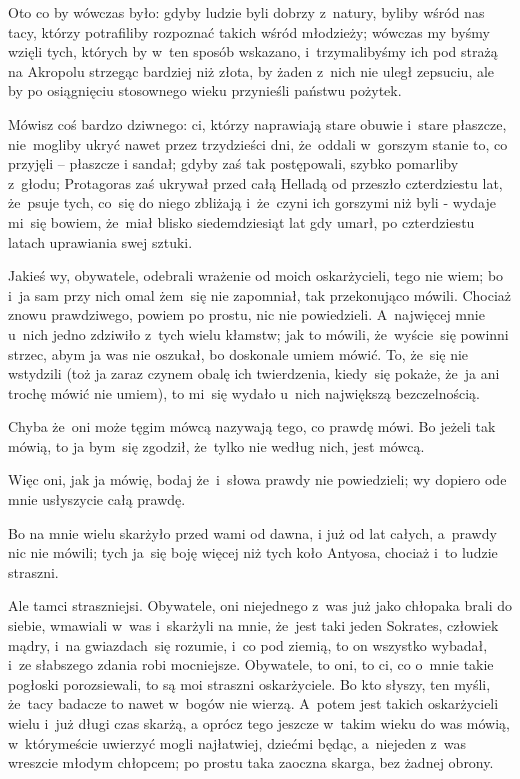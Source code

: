 
\noi Oto co by wówczas było: gdyby ludzie byli dobrzy z~natury, byliby
wśród nas tacy, którzy potrafiliby rozpoznać takich wśród młodzieży;
wówczas my byśmy wzięli tych, których by w~ten sposób wskazano,
i~trzymalibyśmy ich pod strażą na Akropolu strzegąc bardziej niż
złota, by żaden z~nich nie uległ zepsuciu, ale by po osiągnięciu
stosownego wieku przynieśli państwu pożytek.



\noi Mówisz coś bardzo dziwnego: ci, którzy naprawiają stare obuwie
i~stare płaszcze, nie~mogliby ukryć nawet przez trzydzieści dni,
że~oddali w~gorszym stanie to, co przyjęli -- płaszcze i sandał; gdyby
zaś tak postępowali, szybko pomarliby z~głodu; Protagoras zaś ukrywał
przed całą Helladą od przeszło czterdziestu lat, że~psuje tych, co~się
do niego zbliżają i~że~czyni ich gorszymi niż byli - wydaje mi~się
bowiem, że~miał blisko siedemdziesiąt lat gdy umarł, po czterdziestu
latach uprawiania swej sztuki.



Jakieś wy, obywatele, odebrali wrażenie od moich oskarżycieli, tego
nie wiem; bo i~ja sam przy nich omal żem~się nie zapomniał, tak
przekonująco mówili. Chociaż znowu prawdziwego, powiem po prostu, nic
nie powiedzieli. A~najwięcej mnie u~nich jedno zdziwiło z~tych wielu
kłamstw; jak to mówili, że~wyście~się powinni strzec, abym ja was nie
oszukał, bo doskonale umiem mówić. To, że~się nie wstydzili (toż ja
zaraz czynem obalę ich twierdzenia, kiedy~się pokaże, że~ja ani trochę
mówić nie umiem), to mi~się wydało u~nich największą bezczelnością.

Chyba że~oni może tęgim mówcą nazywają tego, co prawdę mówi. Bo jeżeli
tak mówią, to ja bym~się zgodził, że~tylko nie według nich, jest
mówcą.

Więc oni, jak ja mówię, bodaj że~i~słowa prawdy nie powiedzieli; wy
dopiero ode mnie usłyszycie całą prawdę.



Bo na mnie wielu skarżyło przed wami od dawna, i już od lat całych,
a~prawdy nic nie mówili; tych ja~się boję więcej niż tych koło
Antyosa, chociaż i~to ludzie straszni.

Ale tamci straszniejsi. Obywatele, oni niejednego z~was już jako
chłopaka brali do siebie, wmawiali w~was i~skarżyli na mnie, że~jest
taki jeden Sokrates, człowiek mądry, i~na gwiazdach~się rozumie, i~co
pod ziemią, to on wszystko wybadał, i~ze słabszego zdania robi
mocniejsze. Obywatele, to oni, to ci, co o~mnie takie pogłoski
porozsiewali, to są moi straszni oskarżyciele. Bo kto słyszy, ten
myśli, że~tacy badacze to nawet w~bogów nie wierzą. A~potem jest
takich oskarżycieli wielu i~już długi czas skarżą, a oprócz tego
jeszcze w~takim wieku do was mówią, w~którymeście uwierzyć mogli
najłatwiej, dziećmi będąc, a~niejeden z~was wreszcie młodym chłopcem;
po prostu taka zaoczna skarga, bez żadnej obrony.

